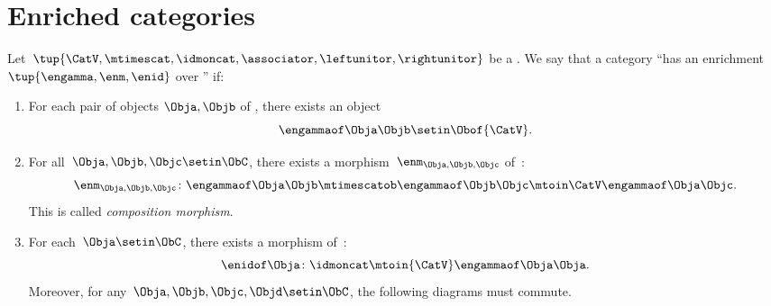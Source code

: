 
\section{Enriched categories}
\label{sec:enrichment-enriched-categories}

\begin{ctdefinition}
    \label{def:enrichment-structure}
    Let~$\tup{\CatV, {{\mtimescat}}, \idmoncat, \associator, \leftunitor,\rightunitor}$ be a .
    We say that a category \CatC ``has an enrichment $\tup{\engamma,\enm,\enid}$ over \CatV'' if:
    \begin{enumerate}
        \item For each pair of objects $\Obja,\Objb$ of \CatC, there exists an object
              \begin{equation}
                  \engammaof\Obja\Objb \setin \Obof{\CatV}.
              \end{equation}
        \item For all~$\Obja, \Objb, \Objc\setin \ObC$, there exists a morphism~$\enm_{\Obja,\Objb,\Objc}$ of~\CatV:
              \begin{equation}
                  \enm_{\Obja,\Objb,\Objc}\colon \engammaof\Obja\Objb \mtimescatob \engammaof\Objb\Objc \mtoin\CatV \engammaof\Obja\Objc.
              \end{equation}
              This is called \emph{composition morphism}.
        \item For each~$\Obja\setin \ObC$, there exists a morphism of~\CatV:
              \begin{equation}
                  \enidof\Obja \colon \idmoncat \mtoin{\CatV} \engammaof\Obja\Obja.
              \end{equation}
              Moreover, for any~$\Obja,\Objb,\Objc,\Objd\setin \ObC$, the following diagrams must commute.
    \end{enumerate}
\end{ctdefinition}

